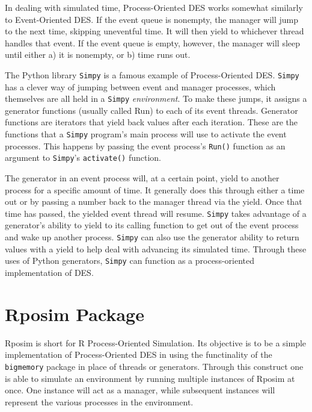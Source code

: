 \documentclass[a4paper, 11pt]{article} %
\begin{document}
In dealing with simulated time, Process-Oriented DES works somewhat similarly to Event-Oriented DES. If the event queue is nonempty, the manager will jump to the next time, skipping uneventful time. It will then yield to whichever thread handles that event. If the event queue is empty, however, the manager will sleep until either a) it is nonempty, or b) time runs out. 

The Python library \texttt{Simpy} is a famous example of Process-Oriented DES. \texttt{Simpy} has a clever way of jumping between event and manager processes, which themselves are all held in a \texttt{Simpy} \textit{environment}. To make these jumps, it assigns a generator functions (usually called Run) to each of its event threads. Generator functions are iterators that yield back values after each iteration. These are the functions that a \texttt{Simpy} program’s main process will use to activate the event processes. This happens by passing the event process’s \texttt{Run()} function as an argument to \texttt{Simpy}’s \texttt{activate()} function.

The generator in an event process will, at a certain point, yield to another process for a specific amount of time. It generally does this through either a time out or by passing a number back to the manager thread via the yield. Once that time has passed, the yielded event thread will resume. \texttt{Simpy} takes advantage of a generator’s ability to yield to its calling function to get out of the event process and wake up another process. \texttt{Simpy} can also use the generator ability to return values with a yield to help deal with advancing its simulated time. Through these uses of Python generators, \texttt{Simpy} can function as a process-oriented implementation of DES.


\section{Rposim Package}

Rposim is short for R Process-Oriented Simulation. Its objective is to be a simple implementation of Process-Oriented DES in using the functinality of the \texttt{bigmemory} package in place of threads or generators. Through this construct one is able to simulate an environment by running multiple instances of Rposim at once. One instance will act as a manager, while subsequent instances will represent the various processes in the environment.
\end{document}
